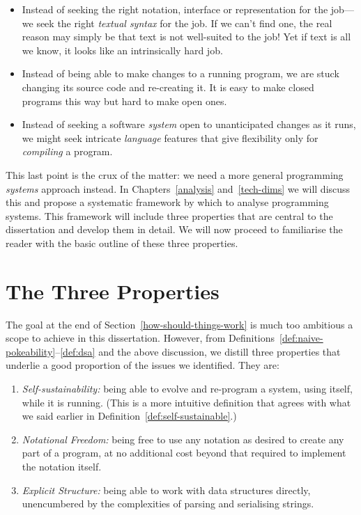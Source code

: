 \begin{itemize}
\tightlist
\item
  Instead of seeking the right notation, interface or representation for
  the job---we seek the right \emph{textual syntax} for the job. If we
  can't find one, the real reason may simply be that text is not
  well-suited to the job! Yet if text is all we know, it looks like an
  intrinsically hard job.
\item
  Instead of being able to make changes to a running program, we are
  stuck changing its source code and re-creating it. It is easy to make
  closed programs this way but hard to make open ones.
\item
  Instead of seeking a software \emph{system} open to unanticipated
  changes as it runs, we might seek intricate \emph{language} features
  that give flexibility only for \emph{compiling} a program.
\end{itemize}

This last point is the crux of the matter: we need a more general
programming \emph{systems} approach instead. In Chapters~\ref{analysis}
and~\ref{tech-dims} we will discuss this and propose a systematic
framework by which to analyse programming systems. This framework will
include three properties that are central to the dissertation and
develop them in detail. We will now proceed to familiarise the reader
with the basic outline of these three properties.


\hypertarget{the-three-properties}{%
\section{The Three Properties}\label{the-three-properties}}

The goal at the end of Section~\ref{how-should-things-work} is much too
ambitious a scope to achieve in this dissertation. However, from
Definitions~\ref{def:naive-pokeability}--\ref{def:dsa} and the above
discussion, we distill three properties that underlie a good proportion
of the issues we identified. They are:

\begin{enumerate}
\def\labelenumi{\arabic{enumi}.}
\tightlist
\item
  \emph{Self-sustainability:} being able to evolve and re-program a
  system, using itself, while it is running. (This is a more intuitive
  definition that agrees with what we said earlier in
  Definition~\ref{def:self-sustainable}.)
\item
  \emph{Notational Freedom:} being free to use any notation as desired
  to create any part of a program, at no additional cost beyond that
  required to implement the notation itself.
\item
  \emph{Explicit Structure:} being able to work with data structures
  directly, unencumbered by the complexities of parsing and serialising
  strings.
\end{enumerate}

